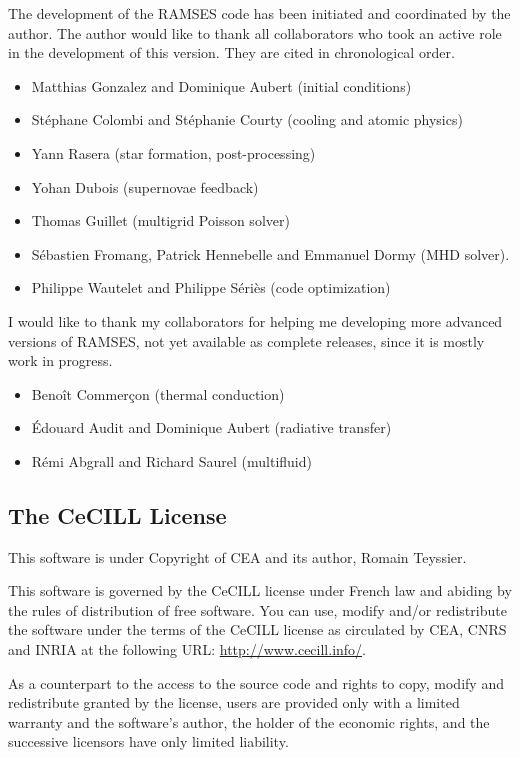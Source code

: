 The development of the RAMSES code has been initiated and coordinated by
the author. The author would like to thank all collaborators who took an
active role in the development of this version. They are cited in
chronological order.

\begin{itemize}
   \item Matthias Gonzalez and Dominique Aubert (initial conditions)
   \item St\'ephane Colombi and St\'ephanie Courty (cooling and atomic
physics)
   \item Yann Rasera (star formation, post-processing)
   \item Yohan Dubois (supernovae feedback)
   \item Thomas Guillet (multigrid Poisson solver)
   \item S\'ebastien Fromang, Patrick Hennebelle and Emmanuel Dormy (MHD
solver).
   \item Philippe Wautelet and Philippe S\'eri\`es (code optimization)
\end{itemize}

I would like to thank my collaborators for helping me developing more
advanced versions of RAMSES, not yet available as complete releases,
since it is mostly work in progress.

\begin{itemize}
   \item Beno\^it Commer\c{c}on (thermal conduction)
   \item \'Edouard Audit and Dominique Aubert (radiative transfer)
   \item R\'emi Abgrall and Richard Saurel (multifluid)
\end{itemize}

\subsection{The CeCILL License}
\label{sec:cecill}

This software is under Copyright of CEA and its author, Romain Teyssier.

This software is governed by the CeCILL license under French law and
abiding by the rules of distribution of free software. You can use,
modify and/or redistribute the software under the terms of the CeCILL
license as circulated by CEA, CNRS and INRIA at the following URL:
\url{http://www.cecill.info/}.

As a counterpart to the access to the source code and rights to copy,
modify and redistribute granted by the license, users are provided only
with a limited warranty and the software's author, the holder of the
economic rights, and the successive licensors have only limited
liability.

